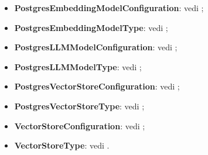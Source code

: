 \documentclass[10pt, a4paper]{article}
\begin{document}
\begin{itemize}
    \item \textbf{PostgresEmbeddingModelConfiguration}: vedi ;
    \item \textbf{PostgresEmbeddingModelType}: vedi ;
    
    \item \textbf{PostgresLLMModelConfiguration}: vedi ;
    \item \textbf{PostgresLLMModelType}: vedi ;

    \item \textbf{PostgresVectorStoreConfiguration}: vedi ;
    \item \textbf{PostgresVectorStoreType}: vedi ;

    \item \textbf{VectorStoreConfiguration}: vedi ;
    \item \textbf{VectorStoreType}: vedi .
   
\end{itemize}
 
    
    
   
   










   
\end{document}
